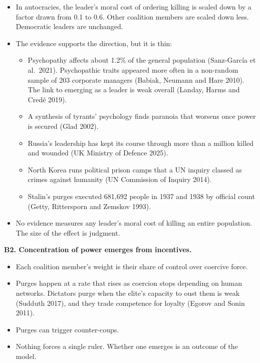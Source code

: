 \documentclass[
  10pt,
]{article}
\providecommand{\tightlist}{%
  \setlength{\itemsep}{0pt}\setlength{\parskip}{0pt}}
\begin{document}
\begin{itemize}
\tightlist
\item
  In autocracies, the leader's moral cost of ordering killing is scaled down by a factor drawn from
  0.1 to 0.6. Other coalition members are scaled down less. Democratic leaders are unchanged.
\item
  The evidence supports the direction, but it is thin:

  \begin{itemize}
  \tightlist
  \item
    Psychopathy affects about 1.2\% of the general population (Sanz-García et al.~2021).
    Psychopathic traits appeared more often in a non-random sample of 203 corporate managers
    (Babiak, Neumann and Hare 2010). The link to emerging as a leader is weak overall (Landay, Harms
    and Credé 2019).
  \item
    A synthesis of tyrants' psychology finds paranoia that worsens once power is secured (Glad
    2002).
  \item
    Russia's leadership has kept its course through more than a million killed and wounded (UK
    Ministry of Defence 2025).
  \item
    North Korea runs political prison camps that a UN inquiry classed as crimes against humanity (UN
    Commission of Inquiry 2014).
  \item
    Stalin's purges executed 681,692 people in 1937 and 1938 by official count (Getty, Rittersporn
    and Zemskov 1993).
  \end{itemize}
\item
  No evidence measures any leader's moral cost of killing an entire population. The size of the
  effect is judgment.
\end{itemize}

\textbf{B2. Concentration of power emerges from incentives.}

\begin{itemize}
\tightlist
\item
  Each coalition member's weight is their share of control over coercive force.
\item
  Purges happen at a rate that rises as coercion stops depending on human networks. Dictators purge
  when the elite's capacity to oust them is weak (Sudduth 2017), and they trade competence for
  loyalty (Egorov and Sonin 2011).
\item
  Purges can trigger counter-coups.
\item
  Nothing forces a single ruler. Whether one emerges is an outcome of the model.
\end{itemize}
\end{document}
